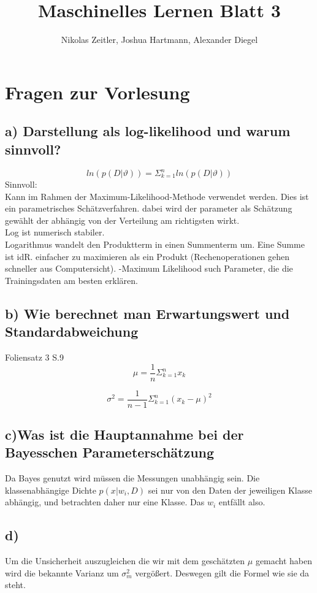 \documentclass{scrartcl}
\author{Nikolas Zeitler, Joshua Hartmann, Alexander Diegel}
\title{Maschinelles Lernen Blatt 3}
\begin{document}
\maketitle
\section{Fragen zur Vorlesung}
\subsection*{a) Darstellung als log-likelihood und warum sinnvoll?}
\[ ln (p(D|\vartheta)) = \Sigma^n_{k=1} ln (p(D|\vartheta)) \]
Sinnvoll: \\
Kann im Rahmen der Maximum-Likelihood-Methode verwendet werden. Dies ist ein parametrisches Schätzverfahren. dabei wird der parameter als Schätzung gewählt der abhängig von der Verteilung am richtigsten wirkt.\\
Log ist numerisch stabiler.  \\
Logarithmus wandelt den Produktterm in einen Summenterm um. Eine Summe ist idR. einfacher zu maximieren 
als ein Produkt (Rechenoperationen gehen schneller aus Computersicht). -Maximum Likelihood such Parameter, die die Trainingsdaten am besten erklären.
\subsection*{b) Wie berechnet man Erwartungswert und Standardabweichung}
Foliensatz 3 S.9 \\
\[\mu = \frac{1}{n}\Sigma^n_{k=1}x_k \]

\[\sigma^2 = \frac{1}{n-1}\Sigma^n_{k=1}(x_k-\mu)^2 \]

\subsection*{c)Was ist die Hauptannahme bei der Bayesschen Parameterschätzung}
Da Bayes genutzt wird müssen die Messungen unabhängig sein.%
Die klassenabhängige Dichte $p(x|w_i,D)$ sei nur von den Daten der jeweiligen Klasse abhängig, und betrachten daher nur eine Klasse. Das $w_i$ entfällt also.
\subsection*{d)}
Um die Unsicherheit auszugleichen die wir mit dem geschätzten $\mu$ gemacht haben wird die bekannte Varianz um $\sigma_m^2$ vergößert. Deswegen gilt die Formel wie sie da steht.
\end{document}
